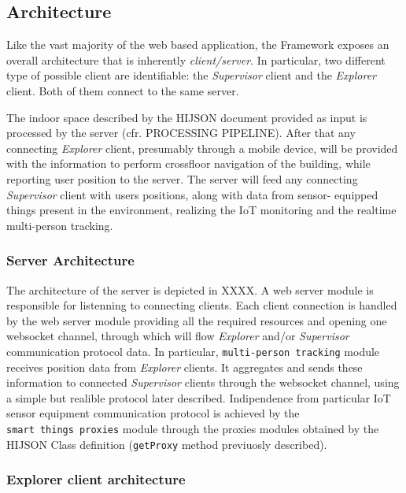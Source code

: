 \subsection{Architecture}\label{architecture}

Like the vast majority of the web based application, the Framework exposes an
overall architecture that is inherently \emph{client/server}. In particular,
two different type of possible client are identifiable: the \emph{Supervisor}
client and the \emph{Explorer} client. Both of them connect to the same
server.

The indoor space described by the HIJSON document provided as input is
processed by the server (cfr. PROCESSING PIPELINE). After that any connecting
\emph{Explorer} client, presumably through a mobile device, will be provided
with the information to perform crossfloor navigation of the building, while
reporting user position to the server. The server will feed any connecting
\emph{Supervisor} client with users positions, along with data from sensor-
equipped things present in the environment, realizing the IoT monitoring and
the realtime multi-person tracking.

\subsubsection{Server Architecture}\label{server-architecture}

The architecture of the server is depicted in XXXX. A web server module
is responsible for listenning to connecting clients. Each client
connection is handled by the web server module providing all the
required resources and opening one websocket channel, through which will
flow \emph{Explorer} and/or \emph{Supervisor} communication protocol
data. In particular, \texttt{multi-person\ tracking} module receives
position data from \emph{Explorer} clients. It aggregates and sends
these information to connected \emph{Supervisor} clients through the
websocket channel, using a simple but realible protocol later described.
Indipendence from particular IoT sensor equipment communication protocol
is achieved by the \texttt{smart\ things\ proxies} module through the
proxies modules obtained by the HIJSON Class definition
(\texttt{getProxy} method previuosly described).

\subsubsection{Explorer client architecture}\label{explorer-client-architecture}

